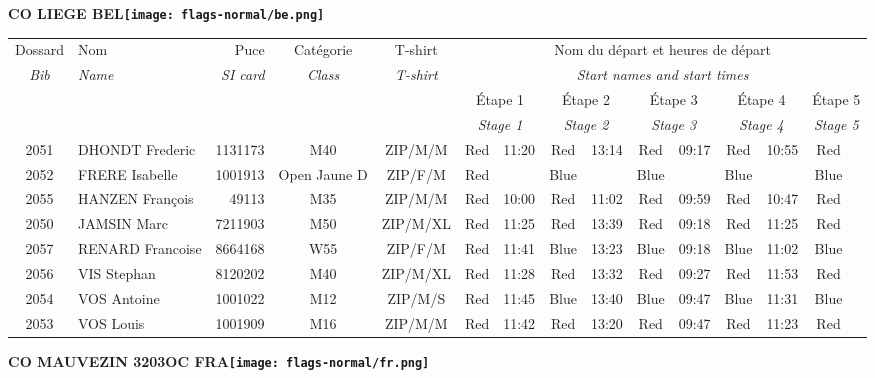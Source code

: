 \documentclass{report}
\begin{document}
\newpage
  \Huge \centering \bfseries CO LIEGE  BEL\normalfont \footnotesize \sffamily \hfill \texttt{[image: flags-normal/be.png]} \newline 
  \begin{longtable}{|c|l|r|c|c|*{5}{cc|}}
    Dossard & Nom  & Puce    & Catégorie & T-shirt & \multicolumn{10}{c|}{Nom du départ et heures de départ} \\
    \itshape Bib     & \itshape Name & \itshape SI card & \itshape Class  & \itshape  T-shirt  & \multicolumn{10}{c|}{\itshape Start names and start times} \\
    \hline
    & & & & & \multicolumn{2}{c|}{Étape 1} & \multicolumn{2}{c|}{Étape 2} & \multicolumn{2}{c|}{Étape 3} & \multicolumn{2}{c|}{Étape 4} & \multicolumn{2}{c|}{Étape 5} \\
    & & & & & \multicolumn{2}{c|}{\itshape Stage 1} & \multicolumn{2}{c|}{\itshape Stage 2} & \multicolumn{2}{c|}{\itshape Stage 3} & \multicolumn{2}{c|}{\itshape Stage 4} & \multicolumn{2}{c|}{\itshape Stage 5} \\
    \hline
    2051 & DHONDT Frederic & 1131173 & M40 & ZIP/M/M & Red & 11:20 & Red & 13:14 & Red & 09:17 & Red & 10:55 & Red &  \\
    2052 & FRERE Isabelle & 1001913 & Open Jaune D & ZIP/F/M & Red &   & Blue &   & Blue &   & Blue &   & Blue &  \\
    2055 & HANZEN François & 49113 & M35 & ZIP/M/M & Red & 10:00 & Red & 11:02 & Red & 09:59 & Red & 10:47 & Red &  \\
    2050 & JAMSIN Marc & 7211903 & M50 & ZIP/M/XL & Red & 11:25 & Red & 13:39 & Red & 09:18 & Red & 11:25 & Red &  \\
    2057 & RENARD Francoise & 8664168 & W55 & ZIP/F/M & Red & 11:41 & Blue & 13:23 & Blue & 09:18 & Blue & 11:02 & Blue &  \\
    2056 & VIS Stephan & 8120202 & M40 & ZIP/M/XL & Red & 11:28 & Red & 13:32 & Red & 09:27 & Red & 11:53 & Red &  \\
    2054 & VOS Antoine & 1001022 & M12 & ZIP/M/S & Red & 11:45 & Blue & 13:40 & Blue & 09:47 & Blue & 11:31 & Blue &  \\
    2053 & VOS Louis & 1001909 & M16 & ZIP/M/M & Red & 11:42 & Red & 13:20 & Red & 09:47 & Red & 11:23 & Red &  \\
  \end{longtable}
\newpage
  \Huge \centering \bfseries CO MAUVEZIN 3203OC FRA\normalfont \footnotesize \sffamily \hfill \texttt{[image: flags-normal/fr.png]} \newline 
\end{document}
